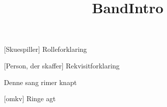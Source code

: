 \documentclass[a4paper,11pt]{article}
\title{BandIntro\texttrademark}
\begin{document}
\maketitle

\begin{roles}
    [Skuespiller] Rolleforklaring
\end{roles}

\begin{props}
    [Person, der skaffer] Rekvisitforklaring
\end{props}

\begin{song}
   Denne sang rimer knapt

  [omkv] Ringe agt

\end{song}
\end{document}
